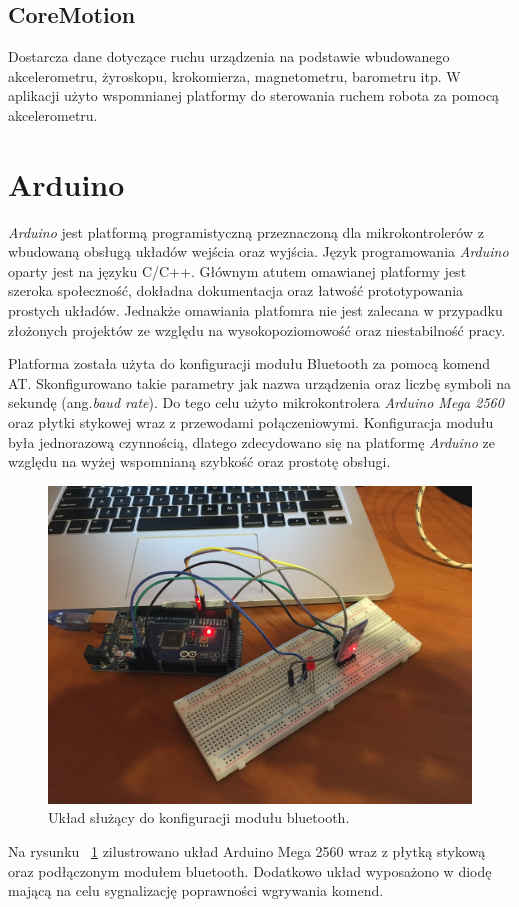 \subsection{CoreMotion}
Dostarcza dane dotyczące ruchu urządzenia na podstawie wbudowanego akcelerometru, żyroskopu, krokomierza, magnetometru, barometru itp. W aplikacji użyto wspomnianej platformy do sterowania ruchem robota za pomocą akcelerometru.

\section{Arduino}
\textit{Arduino} jest platformą programistyczną przeznaczoną dla mikrokontrolerów z wbudowaną obsługą układów wejścia oraz wyjścia. Język programowania \textit{Arduino} oparty jest na języku C/C++. Głównym atutem omawianej platformy jest szeroka społeczność, dokładna dokumentacja oraz łatwość prototypowania prostych układów. Jednakże omawiania platfomra nie jest zalecana w przypadku złożonych projektów ze względu na wysokopoziomowość oraz niestabilność pracy.

Platforma została użyta do konfiguracji modułu Bluetooth za pomocą komend AT. Skonfigurowano takie parametry jak nazwa urządzenia oraz liczbę symboli na sekundę (ang.\textit{baud rate}). Do tego celu użyto mikrokontrolera \textit{Arduino Mega 2560} oraz płytki stykowej wraz z przewodami połączeniowymi. Konfiguracja modułu była jednorazową czynnością, dlatego zdecydowano się na platformę \textit{Arduino} ze względu na wyżej wspomnianą szybkość oraz prostotę obsługi.
  

\begin{figure}[H]
	\centering
		\includegraphics[width=0.75\linewidth]{pic02/arduino.JPG}
	\caption{Układ służący do konfiguracji modułu bluetooth.}
	\label{fig:arduino}	
\end{figure}

Na rysunku ~\ref{fig:arduino} zilustrowano układ Arduino Mega 2560 wraz z płytką stykową oraz podłączonym modułem bluetooth. Dodatkowo układ wyposażono w diodę mającą na celu sygnalizację poprawności wgrywania komend.
 



 
